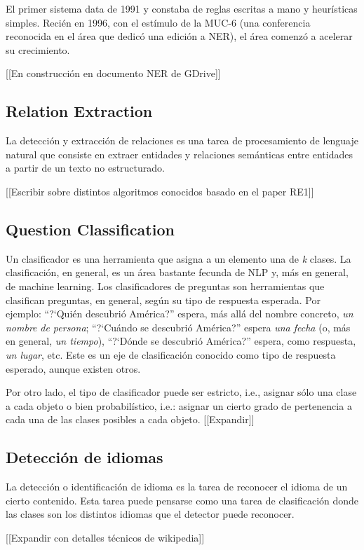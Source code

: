 El primer sistema data de 1991 y constaba de reglas escritas a mano y
heur\'isticas simples. Reci\'en en 1996, con el est\'imulo de la MUC-6
(una conferencia reconocida en el \'area que dedic\'o una edici\'on a
NER), el \'area comenz\'o a acelerar su crecimiento.

[[En construcci\'on en documento NER de GDrive]]

\subsection{Relation Extraction}

La detecci\'on y extracci\'on de relaciones es una tarea de procesamiento
de lenguaje natural que consiste en extraer entidades y relaciones sem\'anticas
entre entidades a partir de un texto no estructurado. 

[[Escribir sobre distintos algoritmos conocidos basado en el paper RE1]]

\subsection{Question Classification}
\label{subsec:qc}
Un clasificador es una herramienta que asigna a un elemento una de
\textit{k }clases. La clasificaci\'on, en general, es un \'area
bastante fecunda de NLP y, m\'as en general, de machine learning. Los
clasificadores de preguntas son herramientas que clasifican preguntas,
en general, seg\'un su tipo de respuesta esperada. Por ejemplo:
{\textquotedblleft}?`Qui\'en descubri\'o Am\'erica?{\textquotedblright}
espera, m\'as all\'a del nombre concreto, \textit{un nombre} \textit{de
persona}; {\textquotedblleft}?`Cu\'ando se descubri\'o
Am\'erica?{\textquotedblright} espera \textit{una fecha} (o, m\'as en
general, \textit{un tiempo}), {\textquotedblleft}?`D\'onde se
descubri\'o Am\'erica?{\textquotedblright} espera, como respuesta,
\textit{un lugar}, etc. Este es un eje de clasificaci\'on conocido como
tipo de respuesta esperado, aunque existen otros.

Por otro lado, el tipo de clasificador puede ser estricto, i.e., asignar
s\'olo una clase a cada objeto o bien probabil\'istico, i.e.: asignar
un cierto grado de pertenencia a cada una de las clases posibles a
cada objeto. 
[[Expandir]]


\subsection{Detección de idiomas}

La detecci\'on o identificaci\'on de idioma es la tarea de reconocer el
idioma de un cierto contenido. Esta tarea puede pensarse como una
tarea de clasificaci\'on donde las clases son los distintos
idiomas que el detector puede reconocer. 

[[Expandir con detalles t\'ecnicos de wikipedia]]


